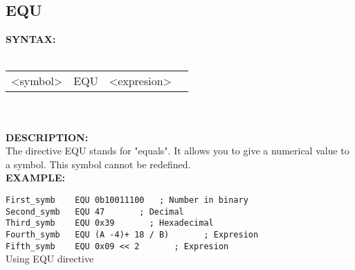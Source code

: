     \subsection{EQU}
                \textbf{SYNTAX:}\\
                        \\ {
                            \texttt{}
                            \begin{tabular}[h!]{llll}
                                    { \color{highlight_symbol} <symbol> }  &
                                    { \color{highlight_directive} EQU } &
                                    { \color{highlight_constant} <expresion> } & { \color{highlight_comment}  }\\
                            \end{tabular}
                        }\\
                        \\
                \textbf{DESCRIPTION:}\\
                The directive EQU stands for "equals". It allows you to give a numerical value to a symbol. This symbol cannot be redefined.
                \\
                \textbf{EXAMPLE:}\\
                        \begin{code}[h!]
                                {\color{highlight_constant}\verb'First_symb'}\verb'    '{\color{highlight_directive}\verb'EQU'}\verb' '{\color{highlight_bin}\verb'0b10011100'}\verb'   '{\color{highlight_comment}\verb'; Number in binary'}\\
                                {\color{highlight_constant}\verb'Second_symb'}\verb'   '{\color{highlight_directive}\verb'EQU'}\verb' '{\color{highlight_oct}\verb'47'}\verb'       '{\color{highlight_comment}\verb'; Decimal'}\\
                                {\color{highlight_constant}\verb'Third_symb'}\verb'    '{\color{highlight_directive}\verb'EQU'}\verb' '{\color{highlight_dec}\verb'0x39'}\verb'       '{\color{highlight_comment}\verb'; Hexadecimal'}\\
                                {\color{highlight_constant}\verb'Fourth_symb'}\verb'   '{\color{highlight_directive}\verb'EQU'}\verb' '{\color{highlight_dec}\verb'(A -4)+ 18 / B)'}\verb'       '{\color{highlight_comment}\verb'; Expresion'}\\
                                {\color{highlight_constant}\verb'Fifth_symb'}\verb'    '{\color{highlight_directive}\verb'EQU'}\verb' '{\color{highlight_dec}\verb'0x09 << 2'}\verb'       '{\color{highlight_comment}\verb'; Expresion'}\\
                        \caption{Using EQU directive}
                    \end{code}

